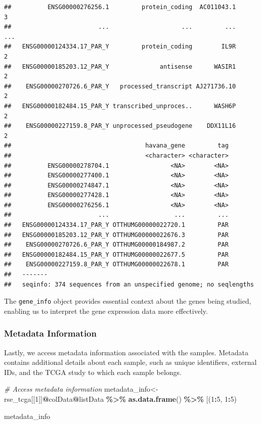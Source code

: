 \documentclass[
]{book}
\newenvironment{Shaded}{\begin{snugshade}}{\end{snugshade}}
\newcommand{\AttributeTok}[1]{\textcolor[rgb]{0.13,0.29,0.53}{#1}}
\newcommand{\CommentTok}[1]{\textcolor[rgb]{0.56,0.35,0.01}{\textit{#1}}}
\newcommand{\DecValTok}[1]{\textcolor[rgb]{0.00,0.00,0.81}{#1}}
\newcommand{\FunctionTok}[1]{\textcolor[rgb]{0.13,0.29,0.53}{\textbf{#1}}}
\newcommand{\NormalTok}[1]{#1}
\newcommand{\OtherTok}[1]{\textcolor[rgb]{0.56,0.35,0.01}{#1}}
\newcommand{\SpecialCharTok}[1]{\textcolor[rgb]{0.81,0.36,0.00}{\textbf{#1}}}
\newcommand{\StringTok}[1]{\textcolor[rgb]{0.31,0.60,0.02}{#1}}
\begin{document}
\begin{verbatim}
##          ENSG00000276256.1         protein_coding  AC011043.1           3
##                        ...                    ...         ...         ...
##   ENSG00000124334.17_PAR_Y         protein_coding        IL9R           2
##   ENSG00000185203.12_PAR_Y              antisense      WASIR1           2
##    ENSG00000270726.6_PAR_Y   processed_transcript AJ271736.10           2
##   ENSG00000182484.15_PAR_Y transcribed_unproces..      WASH6P           2
##    ENSG00000227159.8_PAR_Y unprocessed_pseudogene    DDX11L16           2
##                                     havana_gene         tag
##                                     <character> <character>
##          ENSG00000278704.1                 <NA>        <NA>
##          ENSG00000277400.1                 <NA>        <NA>
##          ENSG00000274847.1                 <NA>        <NA>
##          ENSG00000277428.1                 <NA>        <NA>
##          ENSG00000276256.1                 <NA>        <NA>
##                        ...                  ...         ...
##   ENSG00000124334.17_PAR_Y OTTHUMG00000022720.1         PAR
##   ENSG00000185203.12_PAR_Y OTTHUMG00000022676.3         PAR
##    ENSG00000270726.6_PAR_Y OTTHUMG00000184987.2         PAR
##   ENSG00000182484.15_PAR_Y OTTHUMG00000022677.5         PAR
##    ENSG00000227159.8_PAR_Y OTTHUMG00000022678.1         PAR
##   -------
##   seqinfo: 374 sequences from an unspecified genome; no seqlengths
\end{verbatim}

The \texttt{gene\_info} object provides essential context about the genes being studied, enabling us to interpret the gene expression data more effectively.

\hypertarget{metadata-information}{%
\subsubsection{Metadata Information}\label{metadata-information}}

Lastly, we access metadata information associated with the samples. Metadata contains additional details about each sample, such as unique identifiers, external IDs, and the TCGA study to which each sample belongs.

\begin{Shaded}
\begin{Highlighting}[]
\CommentTok{\# Access metadata information}
\NormalTok{metadata\_info}\OtherTok{\textless{}{-}}\NormalTok{ rse\_tcga[[}\DecValTok{1}\NormalTok{]]}\SpecialCharTok{@}\NormalTok{colData}\SpecialCharTok{@}\NormalTok{listData }\SpecialCharTok{\%\textgreater{}\%} \FunctionTok{as.data.frame}\NormalTok{() }\SpecialCharTok{\%\textgreater{}\%} \StringTok{\textasciigrave{}}\AttributeTok{[}\StringTok{\textasciigrave{}}\NormalTok{(}\DecValTok{1}\SpecialCharTok{:}\DecValTok{5}\NormalTok{, }\DecValTok{1}\SpecialCharTok{:}\DecValTok{5}\NormalTok{)}

\NormalTok{metadata\_info }
\end{Highlighting}
\end{Shaded}
\end{document}
